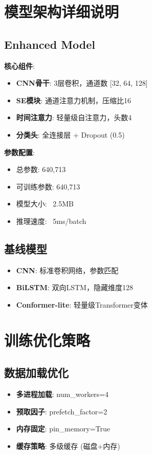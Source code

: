 \section{模型架构详细说明}

\subsection{Enhanced Model}
\textbf{核心组件}:
\begin{itemize}
    \item \textbf{CNN骨干}: 3层卷积，通道数 [32, 64, 128]
    \item \textbf{SE模块}: 通道注意力机制，压缩比16
    \item \textbf{时间注意力}: 轻量级自注意力，头数4
    \item \textbf{分类头}: 全连接层 + Dropout (0.5)
\end{itemize}

\textbf{参数配置}:
\begin{itemize}
    \item 总参数: 640,713
    \item 可训练参数: 640,713
    \item 模型大小: ~2.5MB
    \item 推理速度: ~5ms/batch
\end{itemize}

\subsection{基线模型}
\begin{itemize}
    \item \textbf{CNN}: 标准卷积网络，参数匹配
    \item \textbf{BiLSTM}: 双向LSTM，隐藏维度128
    \item \textbf{Conformer-lite}: 轻量级Transformer变体
\end{itemize}

\section{训练优化策略}

\subsection{数据加载优化}
\begin{itemize}
    \item \textbf{多进程加载}: num\_workers=4
    \item \textbf{预取因子}: prefetch\_factor=2
    \item \textbf{内存固定}: pin\_memory=True
    \item \textbf{缓存策略}: 多级缓存 (磁盘+内存)
\end{itemize}


